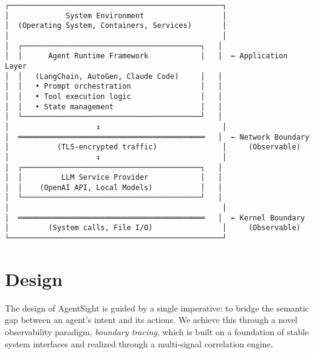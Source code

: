 
\begin{center}
\begin{Verbatim}[fontsize=\small, commandchars=\\\{\}]
┌─────────────────────────────────────────────────┐
│             System Environment                  │
│  (Operating System, Containers, Services)       │
│                                                 │
│  ┌─────────────────────────────────────────┐   │
│  │      Agent Runtime Framework            │   │  ← Application Layer
│  │   (LangChain, AutoGen, Claude Code)     │   │
│  │   • Prompt orchestration                │   │
│  │   • Tool execution logic                │   │
│  │   • State management                    │   │
│  └─────────────────────────────────────────┘   │
│                    ↕                            │
│  ═══════════════════════════════════════════   │  ← Network Boundary
│           (TLS-encrypted traffic)               │     (Observable)
│                    ↕                            │
│  ┌─────────────────────────────────────────┐   │
│  │         LLM Service Provider            │   │
│  │    (OpenAI API, Local Models)           │   │
│  └─────────────────────────────────────────┘   │
│                                                 │
│  ═══════════════════════════════════════════   │  ← Kernel Boundary
│         (System calls, File I/O)                │     (Observable)
└─────────────────────────────────────────────────┘
\end{Verbatim}
\end{center}

\section{Design}

The design of AgentSight is guided by a single imperative: to bridge the semantic gap between an agent's intent and its actions. We achieve this through a novel observability paradigm, \emph{boundary tracing}, which is built on a foundation of stable system interfaces and realized through a multi-signal correlation engine.

